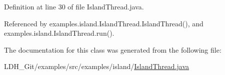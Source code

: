 Definition at line 30 of file Island\-Thread.\-java.



Referenced by examples.\-island.\-Island\-Thread.\-Island\-Thread(), and examples.\-island.\-Island\-Thread.\-run().



The documentation for this class was generated from the following file\-:\begin{DoxyCompactItemize}
\item 
L\-D\-H\-\_\-\-Git/examples/src/examples/island/\hyperlink{_island_thread_8java}{Island\-Thread.\-java}\end{DoxyCompactItemize}

